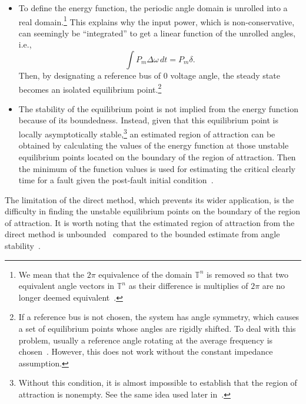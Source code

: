\begin{itemize}
    \item To define the energy function, the periodic angle domain is unrolled into a real domain.\footnote{We mean that the $2\pi$ equivalence of the domain $\mathbb{T}^n$ is removed so that two equivalent angle vectors in $\mathbb{T}^n$ as their difference is multiplies of $2\pi$ are no longer deemed equivalent~\cite{schiffer2019global,forni2014differential}.}  
    This explains why the input power, which is non-conservative, can seemingly be ``integrated'' to get a linear function of the unrolled angles, i.e.,
    \begin{equation*}
        \int P_m \Delta \omega\, dt = P_m \delta.
    \end{equation*}
    Then, by designating a reference bus of $0$ voltage angle, the steady state becomes an isolated equilibrium point.\footnote{If a reference bus is not chosen, the system has angle symmetry, which causes a set of equilibrium points whose angles are rigidly shifted. To deal with this problem, usually a reference angle rotating at the average frequency is chosen~\cite{varaiya1985direct}. However, this does not work without the constant impedance assumption.} %
    \item The stability of the equilibrium point is not implied from the energy function because of its boundedness. Instead, given that this equilibrium point is locally asymptotically stable,\footnote{Without this condition, it is almost impossible to establish that the region of attraction is nonempty. See the same idea used later in~\cite{schiffer2014conditions}.}
    an estimated region of attraction can be obtained by calculating the values of the energy function at those unstable equilibrium points located on the boundary of the region of attraction. Then the minimum of the function values is used for estimating the critical clearly time for a fault given the post-fault initial condition~\cite{cheng2021transient}.
\end{itemize}

The limitation of the direct method, which prevents its wider application, is the difficulty in finding the unstable equilibrium points on the boundary of the region of attraction. It is worth noting that the estimated region of attraction from the direct method is unbounded~\cite{chiang1987foundations} compared to the bounded estimate from angle stability~\cite{dai2024practical}.

